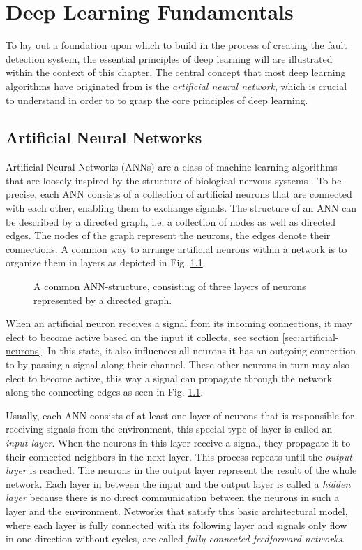 \chapter{Deep Learning Fundamentals}

To lay out a foundation upon which to build in the process of creating
the fault detection system, the essential principles of deep learning
will are illustrated within the context of this chapter. The central
concept that most deep learning algorithms have originated from is the
\textit{artificial neural network}, which is crucial to understand in
order to to grasp the core principles of deep learning.

\section{Artificial Neural Networks}

Artificial Neural Networks (ANNs) are a class of machine learning algorithms
that are loosely inspired by the structure of biological nervous
systems \cite{Haykin}.
To be precise, each ANN consists of a collection of artificial neurons
that are connected with each other, enabling them to exchange signals.
The structure of an ANN can be described by a directed graph, i.e. a
collection of nodes as well as
directed edges. The nodes of the graph represent the neurons, the
edges denote their connections.
A common way to arrange artificial neurons within a network is to organize
them in layers as depicted in Fig. \ref{fig:basic-network}.
\begin{figure}[h]
  \centering
  \resizebox{0.75\textwidth}{!}{}
  \caption{A common ANN-structure, consisting of three layers of
    neurons represented by a directed graph.}
  \label{fig:basic-network}
\end{figure}

When an artificial neuron receives a signal from its
incoming connections, it may elect to become active based on the input
it collects, see section \ref{sec:artificial-neurons}.
In this state, it also influences all neurons it has an outgoing
connection to by passing a signal along their
channel. These other neurons in turn may also elect to become
active, this way a signal can propagate through the network along
the connecting edges as seen in Fig. \ref{fig:basic-network}.

Usually, each ANN consists of at least one layer of neurons that is
responsible for receiving signals from the environment, this special
type of layer is called an \textit{input layer}.
When the neurons in this layer receive a signal, they propagate it
to their connected neighbors in the next layer. This process repeats
until the \textit{output layer} is reached. The neurons in the output
layer represent the result of the whole network. Each layer in between
the input and the output layer is called a \textit{hidden layer}
because there is no direct communication between the neurons in
such a layer and the environment. Networks that satisfy this basic
architectural model, where each layer is fully connected with its
following layer and signals only flow in one direction without cycles,
are called
\textit{fully connected feedforward networks}.

